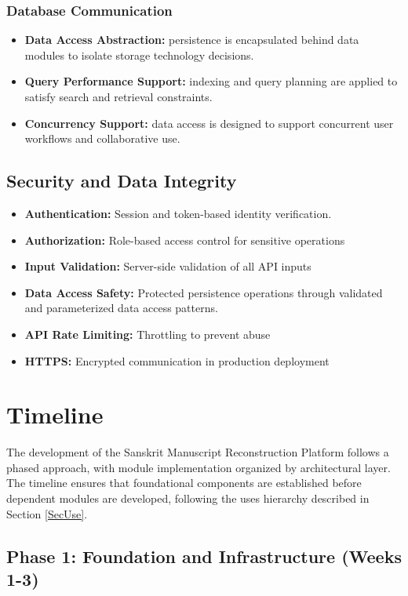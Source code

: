 \documentclass[12pt, titlepage]{article}
\begin{document}
\subsubsection{Database Communication}
\begin{itemize}
  \item \textbf{Data Access Abstraction:} persistence is encapsulated behind data modules to isolate storage technology decisions.
  \item \textbf{Query Performance Support:} indexing and query planning are applied to satisfy search and retrieval constraints.
  \item \textbf{Concurrency Support:} data access is designed to support concurrent user workflows and collaborative use.
\end{itemize}

\subsection{Security and Data Integrity}

\begin{itemize}
  \item \textbf{Authentication:} Session and token-based identity verification.
    \item \textbf{Authorization:} Role-based access control for sensitive operations
    \item \textbf{Input Validation:} Server-side validation of all API inputs
  \item \textbf{Data Access Safety:} Protected persistence operations through validated and parameterized data access patterns.
    \item \textbf{API Rate Limiting:} Throttling to prevent abuse
    \item \textbf{HTTPS:} Encrypted communication in production deployment
\end{itemize}


\section{Timeline}

The development of the Sanskrit Manuscript Reconstruction Platform follows a phased approach, with module implementation organized by architectural layer. The timeline ensures that foundational components are established before dependent modules are developed, following the uses hierarchy described in Section \ref{SecUse}.

\subsection{Phase 1: Foundation and Infrastructure (Weeks 1-3)}
\end{document}
